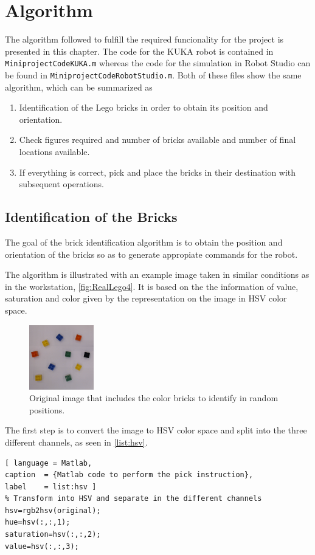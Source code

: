 \chapter{Algorithm}\label{chap:algorithm}
The algorithm followed to fulfill the required funcionality for the project is presented in this chapter. The code for the KUKA robot is contained in \lstinline[style=matlabinline]{MiniprojectCodeKUKA.m} whereas the code for the simulation in Robot Studio can be found in \lstinline[style=matlabinline]{MiniprojectCodeRobotStudio.m}. Both of these files show the same algorithm, which can be summarized as
\begin{enumerate}
	\item Identification of the Lego bricks in order to obtain its position and orientation.
	\item Check figures required and number of bricks available and number of final locations available. 
	\item If everything is correct, pick and place the bricks in their destination with subsequent operations.
\end{enumerate}
\section{Identification of the Bricks}
The goal of the brick identification algorithm is to obtain the position and orientation of the bricks so as to generate appropiate commands for the robot.

The algorithm is illustrated with an example image taken in similar conditions as in the workstation, \autoref{fig:RealLego4}. It is based on the the information of value, saturation and color given by the representation on the image in HSV color space.

\begin{figure}[H]
	\includegraphics[width=0.25\textwidth]{figures/original.png}
	\caption{Original image that includes the color bricks to identify in random positions.}
	\label{fig:RealLego4}
\end{figure}

The first step is to convert the image to HSV color space and split into the three different channels, as seen in \autoref{list:hsv}.
%
\begin{lstlisting}[ language = Matlab,
caption  = {Matlab code to perform the pick instruction},
label    = list:hsv ]
% Transform into HSV and separate in the different channels
hsv=rgb2hsv(original);
hue=hsv(:,:,1);
saturation=hsv(:,:,2);
value=hsv(:,:,3);
\end{lstlisting}

